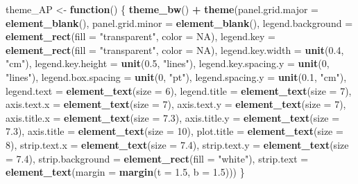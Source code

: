 \documentclass[
  11pt,
]{article}
\newenvironment{Shaded}{\begin{snugshade}}{\end{snugshade}}
\newcommand{\AttributeTok}[1]{\textcolor[rgb]{0.13,0.29,0.53}{#1}}
\newcommand{\ConstantTok}[1]{\textcolor[rgb]{0.56,0.35,0.01}{#1}}
\newcommand{\ControlFlowTok}[1]{\textcolor[rgb]{0.13,0.29,0.53}{\textbf{#1}}}
\newcommand{\DecValTok}[1]{\textcolor[rgb]{0.00,0.00,0.81}{#1}}
\newcommand{\FloatTok}[1]{\textcolor[rgb]{0.00,0.00,0.81}{#1}}
\newcommand{\FunctionTok}[1]{\textcolor[rgb]{0.13,0.29,0.53}{\textbf{#1}}}
\newcommand{\NormalTok}[1]{#1}
\newcommand{\OtherTok}[1]{\textcolor[rgb]{0.56,0.35,0.01}{#1}}
\newcommand{\SpecialCharTok}[1]{\textcolor[rgb]{0.81,0.36,0.00}{\textbf{#1}}}
\newcommand{\StringTok}[1]{\textcolor[rgb]{0.31,0.60,0.02}{#1}}
\begin{document}
\begin{Shaded}
\begin{Highlighting}[]
\NormalTok{theme\_AP }\OtherTok{\textless{}{-}} \ControlFlowTok{function}\NormalTok{() \{}
  \FunctionTok{theme\_bw}\NormalTok{() }\SpecialCharTok{+}
    \FunctionTok{theme}\NormalTok{(}\AttributeTok{panel.grid.major =} \FunctionTok{element\_blank}\NormalTok{(),}
          \AttributeTok{panel.grid.minor =} \FunctionTok{element\_blank}\NormalTok{(),}
          \AttributeTok{legend.background =} \FunctionTok{element\_rect}\NormalTok{(}\AttributeTok{fill =} \StringTok{"transparent"}\NormalTok{, }\AttributeTok{color =} \ConstantTok{NA}\NormalTok{),}
          \AttributeTok{legend.key =} \FunctionTok{element\_rect}\NormalTok{(}\AttributeTok{fill =} \StringTok{"transparent"}\NormalTok{, }\AttributeTok{color =} \ConstantTok{NA}\NormalTok{),}
          \AttributeTok{legend.key.width =} \FunctionTok{unit}\NormalTok{(}\FloatTok{0.4}\NormalTok{, }\StringTok{"cm"}\NormalTok{),}
          \AttributeTok{legend.key.height =} \FunctionTok{unit}\NormalTok{(}\FloatTok{0.5}\NormalTok{, }\StringTok{"lines"}\NormalTok{),}
          \AttributeTok{legend.key.spacing.y =} \FunctionTok{unit}\NormalTok{(}\DecValTok{0}\NormalTok{, }\StringTok{"lines"}\NormalTok{),}
          \AttributeTok{legend.box.spacing =} \FunctionTok{unit}\NormalTok{(}\DecValTok{0}\NormalTok{, }\StringTok{"pt"}\NormalTok{),}
          \AttributeTok{legend.spacing.y  =} \FunctionTok{unit}\NormalTok{(}\FloatTok{0.1}\NormalTok{, }\StringTok{"cm"}\NormalTok{),}
          \AttributeTok{legend.text =} \FunctionTok{element\_text}\NormalTok{(}\AttributeTok{size =} \DecValTok{6}\NormalTok{),}
          \AttributeTok{legend.title =} \FunctionTok{element\_text}\NormalTok{(}\AttributeTok{size =} \DecValTok{7}\NormalTok{),}
          \AttributeTok{axis.text.x =} \FunctionTok{element\_text}\NormalTok{(}\AttributeTok{size =} \DecValTok{7}\NormalTok{),}
          \AttributeTok{axis.text.y =} \FunctionTok{element\_text}\NormalTok{(}\AttributeTok{size =} \DecValTok{7}\NormalTok{),}
          \AttributeTok{axis.title.x =} \FunctionTok{element\_text}\NormalTok{(}\AttributeTok{size =} \FloatTok{7.3}\NormalTok{),}
          \AttributeTok{axis.title.y =} \FunctionTok{element\_text}\NormalTok{(}\AttributeTok{size =} \FloatTok{7.3}\NormalTok{),}
          \AttributeTok{axis.title =} \FunctionTok{element\_text}\NormalTok{(}\AttributeTok{size =} \DecValTok{10}\NormalTok{),}
          \AttributeTok{plot.title =} \FunctionTok{element\_text}\NormalTok{(}\AttributeTok{size =} \DecValTok{8}\NormalTok{),}
          \AttributeTok{strip.text.x =} \FunctionTok{element\_text}\NormalTok{(}\AttributeTok{size =} \FloatTok{7.4}\NormalTok{),}
          \AttributeTok{strip.text.y =} \FunctionTok{element\_text}\NormalTok{(}\AttributeTok{size =} \FloatTok{7.4}\NormalTok{),}
          \AttributeTok{strip.background =} \FunctionTok{element\_rect}\NormalTok{(}\AttributeTok{fill =} \StringTok{"white"}\NormalTok{),}
          \AttributeTok{strip.text =} \FunctionTok{element\_text}\NormalTok{(}\AttributeTok{margin =} \FunctionTok{margin}\NormalTok{(}\AttributeTok{t =} \FloatTok{1.5}\NormalTok{, }\AttributeTok{b =} \FloatTok{1.5}\NormalTok{)))}
\NormalTok{\}}



\end{Highlighting}
\end{Shaded}
\end{document}
